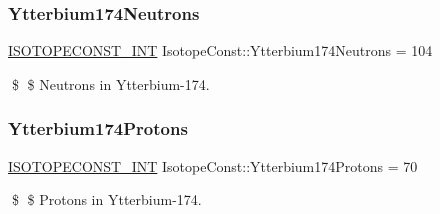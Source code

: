 \subsubsection{\texorpdfstring{Ytterbium174\+Neutrons}{Ytterbium174Neutrons}}
{\footnotesize\ttfamily \mbox{\hyperlink{group___isotope_const-_macros_ga5f18360b3e99483a35c32d789e62621c}{I\+S\+O\+T\+O\+P\+E\+C\+O\+N\+S\+T\+\_\+\+I\+NT}} Isotope\+Const\+::\+Ytterbium174\+Neutrons = 104}

\$ \$ Neutrons in Ytterbium-\/174. \mbox{\label{group___isotope_const-_ytterbium-_yb174_gab9b5e087988e9c65616a935c21be87f8}} 
\subsubsection{\texorpdfstring{Ytterbium174\+Protons}{Ytterbium174Protons}}
{\footnotesize\ttfamily \mbox{\hyperlink{group___isotope_const-_macros_ga5f18360b3e99483a35c32d789e62621c}{I\+S\+O\+T\+O\+P\+E\+C\+O\+N\+S\+T\+\_\+\+I\+NT}} Isotope\+Const\+::\+Ytterbium174\+Protons = 70}

\$ \$ Protons in Ytterbium-\/174. 
